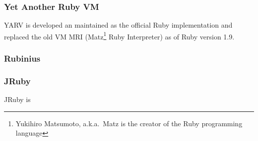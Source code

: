 \subsubsection{Yet Another Ruby VM}
YARV is developed an maintained as the official Ruby implementation and replaced
the old VM MRI (Matz\footnote{Yukihiro Matsumoto, a.k.a.\ Matz is the creator of 
the Ruby programming language} Ruby Interpreter) as of Ruby version 1.9. 

\subsubsection{Rubinius}


\subsubsection{JRuby}
JRuby is 


